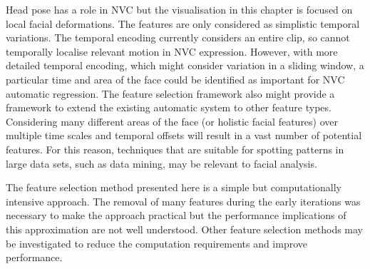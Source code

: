 Head pose has a role in \ac{NVC} but the visualisation in this chapter is focused on local facial deformations. The features are only considered as simplistic temporal variations. The temporal encoding currently considers an entire clip, so cannot temporally localise relevant motion in \ac{NVC} expression. However, with more detailed temporal encoding, which might consider variation in a sliding window, a particular time and area of the face could be identified as important for \ac{NVC} automatic regression. The feature selection framework also might provide a framework to extend the existing automatic system to other feature types. Considering many different areas of the face (or holistic facial features) over multiple time scales and temporal offsets will result in a vast number of potential features. For this reason, techniques that are suitable for spotting patterns in large data sets, such as data mining, may be relevant to facial analysis. %

The feature selection method presented here is a simple but computationally intensive approach. The removal of many features during the early iterations was necessary to make the approach practical but the performance implications of this approximation are not well understood. Other feature selection methods may be investigated to reduce the computation requirements and improve performance.

